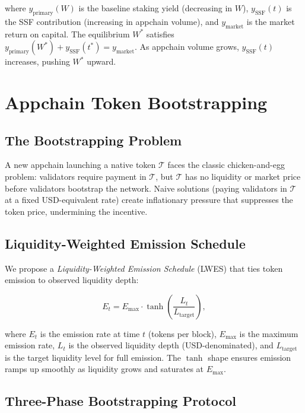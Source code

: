 \documentclass[11pt]{article}
\begin{document}
where $y_{\text{primary}}(W)$ is the baseline staking yield (decreasing in $W$),
$y_{\text{SSF}}(t)$ is the SSF contribution (increasing in appchain volume), and
$y_{\text{market}}$ is the market return on capital. The equilibrium $W^*$ satisfies
$y_{\text{primary}}(W^*) + y_{\text{SSF}}(t^*) = y_{\text{market}}$. As appchain volume
grows, $y_{\text{SSF}}(t)$ increases, pushing $W^*$ upward.

\section{Appchain Token Bootstrapping}
\label{sec:bootstrapping}

\subsection{The Bootstrapping Problem}

A new appchain launching a native token $\mathcal{T}$ faces the classic chicken-and-egg
problem: validators require payment in $\mathcal{T}$, but $\mathcal{T}$ has no liquidity
or market price before validators bootstrap the network. Naive solutions (paying validators
in $\mathcal{T}$ at a fixed USD-equivalent rate) create inflationary pressure that suppresses
the token price, undermining the incentive.

\subsection{Liquidity-Weighted Emission Schedule}

We propose a \emph{Liquidity-Weighted Emission Schedule} (LWES) that ties token emission
to observed liquidity depth:

\begin{equation}
  E_t = E_{\max} \cdot \tanh\!\left(\frac{L_t}{L_{\text{target}}}\right),
  \label{eq:lwes}
\end{equation}

where $E_t$ is the emission rate at time $t$ (tokens per block), $E_{\max}$ is the
maximum emission rate, $L_t$ is the observed liquidity depth (USD-denominated), and
$L_{\text{target}}$ is the target liquidity level for full emission. The $\tanh$ shape
ensures emission ramps up smoothly as liquidity grows and saturates at $E_{\max}$.

\subsection{Three-Phase Bootstrapping Protocol}
\end{document}

